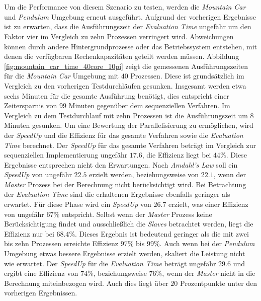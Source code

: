 \\\\
Um die Performance von diesem Szenario zu testen, werden die \emph{Mountain Car} und \emph{Pendulum} Umgebung erneut ausgeführt. Aufgrund der vorherigen Ergebnisse ist zu erwarten, dass die Ausführungszeit der \emph{Evaluation Time} ungefähr um den Faktor vier im Vergleich zu zehn Prozessen verringert wird. Abweichungen können durch andere Hintergrundprozesse oder das Betriebssystem entstehen, mit denen die verfügbaren Rechenkapazitäten geteilt werden müssen. Abbildung \ref{fig:mountain_car_time_40core_10pi} zeigt die gemessenen Ausführungszeiten für die \emph{Mountain Car} Umgebung mit $40$ Prozessen. Diese ist grundsätzlich im Vergleich zu den vorherigen Testdurchläufen gesunken. Insgesamt werden etwa sechs Minuten für die gesamte Ausführung benötigt, dies entspricht einer Zeitersparnis von $99$ Minuten gegenüber dem sequenziellen Verfahren. Im Vergleich zu dem Testdurchlauf mit zehn Prozessen ist die Ausführungszeit um 8 Minuten gesunken. Um eine Bewertung der Parallelisierung zu ermöglichen, wird der \emph{SpeedUp} und die Effizienz für das gesamte Verfahren sowie die \emph{Evaluation Time} berechnet.  Der \emph{SpeedUp} für das gesamte Verfahren beträgt im Vergleich zur sequenziellen Implementierung ungefähr $17.6$, die Effizienz liegt bei $44\%$. Diese Ergebnisse entsprechen nicht den Erwartungen. Nach \emph{Amdahl's Law} soll ein \emph{SpeedUp} von ungefähr $22.5$ erzielt werden, beziehungsweise von $22.1$, wenn der \emph{Master} Prozess bei der Berechnung nicht berücksichtigt wird. Bei Betrachtung der \emph{Evaluation Time} sind die erhaltenen  Ergebnisse ebenfalls geringer als erwartet. Für diese Phase wird ein \emph{SpeedUp} von $26.7$ erzielt, was einer Effizienz von ungefähr $67\%$ entspricht. Selbst wenn der \emph{Master} Prozess keine Berücksichtigung findet und ausschließlich die \emph{Slaves} betrachtet werden, liegt die Effizienz nur bei $68.4\%$. Dieses Ergebnis ist bedeutend geringer als die mit zwei bis zehn Prozessen erreichte Effizienz $97\%$ bis $99\%$. Auch wenn bei der \emph{Pendulum} Umgebung etwas bessere Ergebnisse erzielt werden, skaliert die Leistung nicht wie erwartet. Der \emph{SpeedUp} für die \emph{Evaluation Time} beträgt ungefähr $29.6$ und ergibt eine Effizienz von $74\%$, beziehungsweise $76\%$, wenn der \emph{Master} nicht in die Berechnung miteinbezogen wird. Auch dies liegt über $20$ Prozentpunkte unter den vorherigen Ergebnissen. 
\\\\
